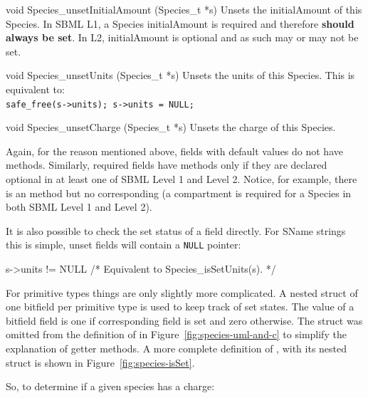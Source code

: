\documentclass{cekmanual}
\begin{document}
\begin{methoddef}{void Species\_unsetInitialAmount (Species\_t *s)}
  Unsets the initialAmount of this Species.  In SBML L1, a Species
  initialAmount is required and therefore \textbf{should always be
  set}.  In L2, initialAmount is optional and as such may or may not
  be set.
\end{methoddef}

\begin{methoddef}{void Species\_unsetUnits (Species\_t *s)}
  Unsets the units of this Species.  This is equivalent to:\\
  \texttt{safe\_free(s->units); s->units = NULL;}
\end{methoddef}

\begin{methoddef}{void Species\_unsetCharge (Species\_t *s)}
  Unsets the charge of this Species.
\end{methoddef}

Again, for the reason mentioned above, fields with default values do
not have  methods.  Similarly, required fields have
 methods only if they are declared optional in at
least one of SBML Level 1 and Level 2.  Notice, for example, there is
an  method but no corresponding
 (a compartment is required for a Species
in both SBML Level 1 and Level 2).

It is also possible to check the set status of a field directly.  For
SName strings this is simple, unset fields will contain a
\texttt{NULL} pointer:

\begin{example}[c]
  s->units != NULL  /* Equivalent to Species_isSetUnits(s). */
\end{example}

For primitive types things are only slightly more complicated.  A
nested  struct of one bitfield per primitive type is
used to keep track of set states.  The value of a bitfield field is
one if corresponding field is set and zero otherwise.  The
 struct was omitted from the definition of
 in Figure~\ref{fig:species-uml-and-c} to simplify
the explanation of getter methods.  A more complete definition of
, with its  nested struct is shown
in Figure~\ref{fig:species-isSet}.


So, to determine if a given species  has a charge:
\end{document}
